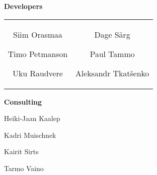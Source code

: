 \documentclass[landscape,footrule]{foils}
\begin{document}
\textbf{Developers}
\begin{center}
\begin{tabular}{cc}
\begin{minipage}[t]{7cm}
\begin{bullets}
\item Siim Orasmaa
\item Timo Petmanson
\item Uku Raudvere
\end{bullets}
\end{minipage}
&
\begin{minipage}[t]{10cm}
\begin{bullets}
\item Dage Särg
\item Paul Tammo
\item Aleksandr Tkatšenko
\end{bullets}  
\end{minipage}
\end{tabular}
\end{center}
\vspace*{2cm}
\textbf{Consulting}
\begin{center}
\begin{minipage}[t]{10cm}
\begin{bullets}
\item Heiki-Jaan Kaalep
\item Kadri Muischnek
\item Kairit Sirts
\item Tarmo Vaino
\end{bullets}  
\end{minipage}
\hspace*{7.5cm}
\end{center}
\end{document}
